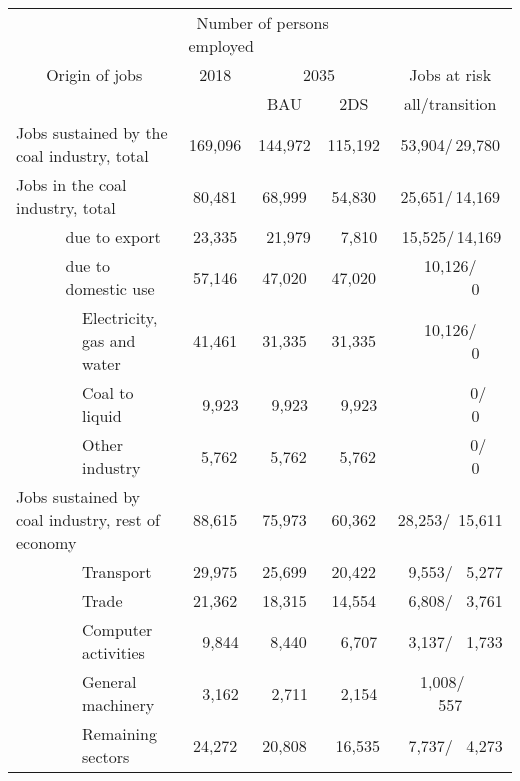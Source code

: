 \documentclass[12pt,english]{article}
\begin{document}
\begin{table}[!t]
	\centering
	\small
	\begin{tabular}{lp{20pt}lcccc}
		\toprule
		\multicolumn{3}{c}{} &\multicolumn{3}{l}{\ Number of persons employed\ } &   \\ 
		\multicolumn{3}{c}{Origin of jobs} & 2018 & \multicolumn{2}{c}{2035} & Jobs at risk  \\ 
		\multicolumn{3}{c}{} & &  BAU & 2DS & all/transition\\ 
		\midrule
		\multicolumn{3}{l}{Jobs sustained by the coal industry, total} & 169,096 &144,972   & 115,192 & 53,904/\,29,780\\ 
		\midrule
		\multicolumn{3}{l}{Jobs in the coal industry, total} & 80,481 &68,999   & 54,830 & 25,651/\,14,169\\ 
		\midrule
		\ \ \ \ & \multicolumn{2}{l}{due to export}  	   & 23,335 &\ 21,979  & \ \,7,810 & \,15,525/\,14,169\\ 
		& \multicolumn{2}{l}{due to domestic use}  & 57,146 & 47,020  & 47,020 & \,10,126/\,\ \ \ \ \ \ \,0\\ 
		& 	 & Electricity, gas and water 		   & 41,461 & 31,335  & 31,335 & \,10,126/\,\ \ \ \ \ \ \,0\\ 
		&    & Coal to liquid & \ \,9,923  &\ \,9,923 &\ \,9,923 & \,\ \ \ \ \ \ \ 0/\,\ \ \ \ \ \ \,0\\ 
		&    & Other industry &\ 5,762 &\ 5,762 &\ 5,762    & \,\ \ \ \ \ \ \ 0/\,\ \ \ \ \ \ \,0 \\ 
		\midrule
		\multicolumn{3}{l}{Jobs sustained by coal industry, rest of economy}  & 88,615 & 75,973  & 60,362 & 28,253/\ 15,611\\ 
		\midrule
		& 						 & Transport & 29,975 & 25,699  &  20,422  & \ \,9,553/ \ 5,277\\ 
		& 						 & Trade & 21,362& 18,315 &  14,554  &\ \,6,808/ \ 3,761 \\ 
		& 						 & Computer activities & \ \,9,844& \, 8,440 & \ \,6,707   &\ \,3,137/ \ 1,733\\
		& 						 & General machinery &\ \,3,162 & \ \,2,711  &  \ \,2,154 &\ \ 1,008/ \ \ \ \,557 \\  
		& 						 & Remaining sectors & 24,272 & 20,808&  \ 16,535  &\ \,7,737/ \ 4,273 \\  													
		\bottomrule
	\end{tabular}

\end{table}
\end{document}
